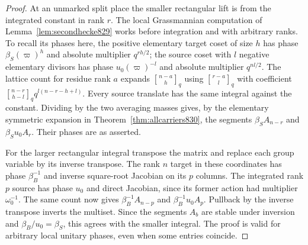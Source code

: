 \documentclass[a4paper,11pt]{article}
\theoremstyle{definition}
\theoremstyle{remark}
\numberwithin{equation}{section}
\begin{document}
\begin{proof}
At an unmarked split place the smaller rectangular lift
is from the integrated constant in rank \(r\). The local
Grassmannian computation of Lemma~\ref{lem:secondhecke829}
works before integration and with arbitrary ranks. To
recall its phases here, the positive elementary target
coset of size \(h\) has phase \(\beta_S(\varpi)^h\) and
absolute multiplier \(q^{rh/2}\); the source coset with
\(l\) negative elementary divisors has phase \(u_0(\varpi)^{-l}\)
and absolute multiplier \(q^{nl/2}\). The lattice count
for residue rank \(a\) expands
\({n-a\brack h}_q\) using \({r-a\brack l}_q\) with coefficient
\({n-r\brack h-l}_q q^{l(n-r-h+l)}\). Every source translate
has the same integral against the constant. Dividing by the
two averaging masses gives, by the elementary symmetric
expansion in Theorem~\ref{thm:allcarriers830}, the segments
\(\beta_S A_{n-r}\) and \(\beta_S u_0 A_r\).
Their phases are as asserted.

For the larger rectangular integral transpose the matrix
and replace each group variable by its inverse transpose.
The rank \(n\) target in these coordinates has phase
\(\beta_B^{-1}\) and inverse square-root Jacobian on its
\(p\) columns. The integrated rank \(p\) source has phase
\(u_0\) and direct Jacobian, since its former action had
multiplier \(\omega_0^{-1}\). The same count now gives
\(\beta_B^{-1}A_{n-p}\) and \(\beta_B^{-1}u_0 A_p\).
Pullback by the inverse transpose inverts the multiset.
Since the segments \(A_b\) are stable under inversion and
\(\beta_B/u_0=\beta_S\), this agrees with the smaller
integral. The proof is valid for arbitrary local unitary
phases, even when some entries coincide.


\end{proof}
\end{document}
